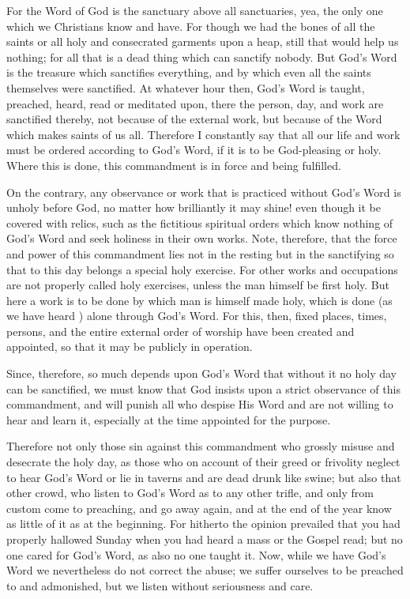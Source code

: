 For the Word of God is the sanctuary above all sanctuaries, yea, the
only one which we Christians know and have. For though we had the bones
of all the saints or all holy and consecrated garments upon a heap,
still that would help us nothing; for all that is a dead thing which
can sanctify nobody. But God's Word is the treasure which sanctifies
everything, and by which even all the saints themselves were
sanctified. At whatever hour then, God's Word is taught, preached,
heard, read or meditated upon, there the person, day, and work are
sanctified thereby, not because of the external work, but because of
the Word which makes saints of us all. Therefore I constantly say that
all our life and work must be ordered according to God's Word, if it is
to be God-pleasing or holy. Where this is done, this commandment is in
force and being fulfilled.

On the contrary, any observance or work that is practiced without
God's Word is unholy before God, no matter how brilliantly it may
shine! even though it be covered with relics, such as the fictitious
spiritual orders which know nothing of God's Word and seek holiness in
their own works. Note, therefore, that the force and power of this
commandment lies not in the resting but in the sanctifying so that to
this day belongs a special holy exercise. For other works and
occupations are not properly called holy exercises, unless the man
himself be first holy. But here a work is to be done by which man is
himself made holy, which is done (as we have heard ) alone through
God's Word. For this, then, fixed places, times, persons, and the
entire external order of worship have been created and appointed, so
that it may be publicly in operation.

Since, therefore, so much depends upon God's Word that without it no
holy day can be sanctified, we must know that God insists upon a strict
observance of this commandment, and will punish all who despise His
Word and are not willing to hear and learn it, especially at the time
appointed for the purpose.

Therefore not only those sin against this commandment who grossly
misuse and desecrate the holy day, as those who on account of their
greed or frivolity neglect to hear God's Word or lie in taverns and are
dead drunk like swine; but also that other crowd, who listen to God's
Word as to any other trifle, and only from custom come to preaching,
and go away again, and at the end of the year know as little of it as
at the beginning. For hitherto the opinion prevailed that you had
properly hallowed Sunday when you had heard a mass or the Gospel read;
but no one cared for God's Word, as also no one taught it. Now, while
we have God's Word we nevertheless do not correct the abuse; we suffer
ourselves to be preached to and admonished, but we listen without
seriousness and care.

